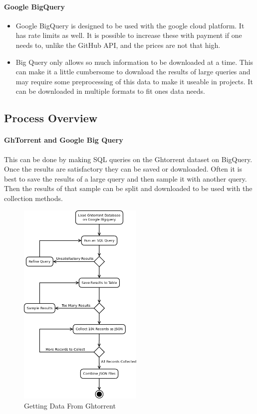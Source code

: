 \documentclass{article}
\begin{document}
\paragraph{Google BigQuery}
\begin{itemize}
    \item Google BigQuery is designed to be used with the google cloud platform. It has rate limits as well. It is possible to increase these with payment if one needs to, unlike the GitHub API, and the prices are not that high.

    \item Big Query only allows so much information to be downloaded at a time. This can make it a little cumbersome to download the results of large queries and may require some preprocessing of this data to make it useable in projects. It can be downloaded in multiple formats to fit ones data needs.
\end{itemize}


\subsection{Process Overview}

\paragraph{GhTorrent and Google Big Query}
This can be done by making SQL queries on the Ghtorrent dataset on BigQuery. Once the results are satisfactory they can be saved or downloaded. Often it is best to save the results of a large query and then sample it with another query. Then the results of that sample can be split and downloaded to be used with the collection methods.

\begin{figure}[!h]
    \centering
    \includegraphics[height=10cm]{diagrams/ght_process.png}
    \caption{Getting Data From Ghtorrent}
\end{figure}
\end{document}
